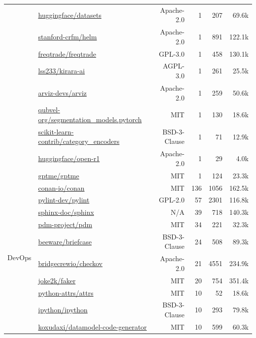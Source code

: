 {\begin{tabular}{llrrrr}
& \href{https://github.com/huggingface/datasets}{huggingface/datasets} & Apache-2.0 & 1 & 207 & 69.6k \\
& \href{https://github.com/stanford-crfm/helm}{stanford-crfm/helm} & Apache-2.0 & 1 & 891 & 122.1k \\
& \href{https://github.com/freqtrade/freqtrade}{freqtrade/freqtrade} & GPL-3.0 & 1 & 458 & 130.1k \\
& \href{https://github.com/lss233/kirara-ai}{lss233/kirara-ai} & AGPL-3.0 & 1 & 261 & 25.5k \\
& \href{https://github.com/arviz-devs/arviz}{arviz-devs/arviz} & Apache-2.0 & 1 & 259 & 50.6k \\
& \href{https://github.com/qubvel-org/segmentation\_models.pytorch}{qubvel-org/segmentation\_models.pytorch} & MIT & 1 & 130 & 18.6k \\
& \href{https://github.com/scikit-learn-contrib/category\_encoders}{scikit-learn-contrib/category\_encoders} & BSD-3-Clause & 1 & 71 & 12.9k \\
& \href{https://github.com/huggingface/open-r1}{huggingface/open-r1} & Apache-2.0 & 1 & 29 & 4.0k \\
& \href{https://github.com/gptme/gptme}{gptme/gptme} & MIT & 1 & 124 & 23.3k \\
\midrule
\multirow{23}{*}{DevOps} & \href{https://github.com/conan-io/conan}{conan-io/conan} & MIT & 136 & 1056 & 162.5k \\
& \href{https://github.com/pylint-dev/pylint}{pylint-dev/pylint} & GPL-2.0 & 57 & 2301 & 116.8k \\
& \href{https://github.com/sphinx-doc/sphinx}{sphinx-doc/sphinx} & N/A & 39 & 718 & 140.3k \\
& \href{https://github.com/pdm-project/pdm}{pdm-project/pdm} & MIT & 34 & 221 & 32.3k \\
& \href{https://github.com/beeware/briefcase}{beeware/briefcase} & BSD-3-Clause & 24 & 508 & 89.3k \\
& \href{https://github.com/bridgecrewio/checkov}{bridgecrewio/checkov} & Apache-2.0 & 21 & 4551 & 234.9k \\
& \href{https://github.com/joke2k/faker}{joke2k/faker} & MIT & 20 & 754 & 351.4k \\
& \href{https://github.com/python-attrs/attrs}{python-attrs/attrs} & MIT & 10 & 52 & 18.6k \\
& \href{https://github.com/ipython/ipython}{ipython/ipython} & BSD-3-Clause & 10 & 293 & 79.8k \\
& \href{https://github.com/koxudaxi/datamodel-code-generator}{koxudaxi/datamodel-code-generator} & MIT & 10 & 599 & 60.3k \\

\end{tabular}}
